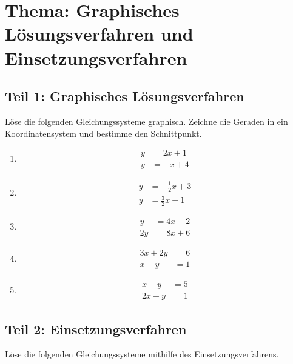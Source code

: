 \section*{Thema: Graphisches Lösungsverfahren und Einsetzungsverfahren}

\subsection*{Teil 1: Graphisches Lösungsverfahren}
Löse die folgenden Gleichungssysteme graphisch. Zeichne die Geraden in ein Koordinatensystem und bestimme den Schnittpunkt.

\begin{enumerate}
    \item
    \[
    \begin{aligned}
    y &= 2x + 1 \\
    y &= -x + 4
    \end{aligned}
    \]

    \item
    \[
    \begin{aligned}
    y &= -\frac{1}{2}x + 3 \\
    y &= \frac{3}{2}x - 1
    \end{aligned}
    \]

    \item
    \[
    \begin{aligned}
    y &= 4x - 2 \\
    2y &= 8x + 6
    \end{aligned}
    \]

    \item
    \[
    \begin{aligned}
    3x + 2y &= 6 \\
    x - y &= 1
    \end{aligned}
    \]

    \item
    \[
    \begin{aligned}
    x + y &= 5 \\
    2x - y &= 1
    \end{aligned}
    \]
\end{enumerate}

\subsection*{Teil 2: Einsetzungsverfahren}
Löse die folgenden Gleichungssysteme mithilfe des Einsetzungsverfahrens.

